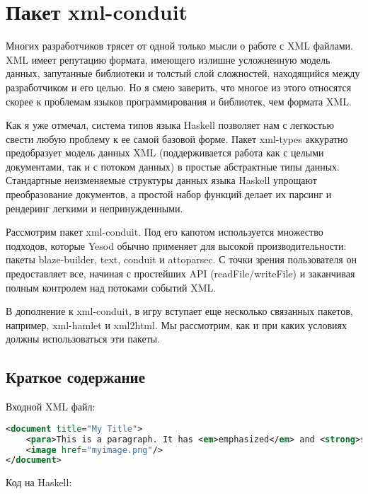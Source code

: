 \chapter{Пакет xml-conduit}

Многих разработчиков трясет от одной только мысли о работе с XML файлами. XML имеет репутацию формата, имеющего излишне усложненную модель данных, запутанные библиотеки и толстый слой сложностей, находящийся между разработчиком и его целью. Но я смею заверить, что многое из этого относятся скорее к проблемам языков программирования и библиотек, чем формата XML.

Как я уже отмечал, система типов языка Haskell позволяет нам с легкостью свести любую проблему к ее самой базовой форме. Пакет xml-types аккуратно предобразует модель данных XML (поддерживается работа как с целыми документами, так и с потоком данных) в простые абстрактные типы данных. Стандартные неизменяемые структуры данных языка Haskell упрощают преобразование документов, а простой набор функций делает их парсинг и рендеринг легкими и непринужденными. %

Рассмотрим пакет xml-conduit. Под его капотом используется множество подходов, которые Yesod обычно применяет для высокой производительности: пакеты blaze-builder, text, conduit и attoparsec. С точки зрения пользователя он предоставляет все, начиная с простейших API (readFile/writeFile) и заканчивая полным контролем над потоками событий XML.

В дополнение к xml-conduit, в игру вступает еще несколько связанных пакетов, например, xml-hamlet и xml2html. Мы рассмотрим, как и при каких условиях должны использоваться эти пакеты.

\section{Краткое содержание} %

Входной XML файл:

\begin{lstlisting}[language=XML]
<document title="My Title">
    <para>This is a paragraph. It has <em>emphasized</em> and <strong>strong</strong> words.</para>
    <image href="myimage.png"/>
</document>
\end{lstlisting}

Код на Haskell:

